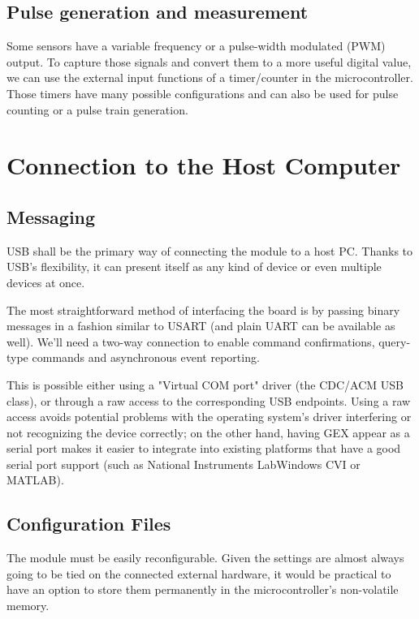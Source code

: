 \subsection{Pulse generation and measurement}

Some sensors have a variable frequency or a pulse-width modulated (PWM) output. To capture those signals and convert them to a more useful digital value, we can use the external input functions of a timer/counter in the microcontroller. Those timers have many possible configurations and can also be used for pulse counting or a pulse train generation.

\section{Connection to the Host Computer}

\subsection{Messaging}

USB shall be the primary way of connecting the module to a host PC. Thanks to USB's flexibility, it can present itself as any kind of device or even multiple devices at once.

The most straightforward method of interfacing the board is by passing binary messages in a fashion similar to USART (and plain UART can be available as well). We'll need a two-way connection to enable command confirmations, query-type commands and asynchronous event reporting.

This is possible either using a "Virtual COM port" driver (the CDC/ACM USB class), or through a raw access to the corresponding USB endpoints. Using a raw access avoids potential problems with the operating system's driver interfering or not recognizing the device correctly; on the other hand, having GEX appear as a serial port makes it easier to integrate into existing platforms that have a good serial port support (such as National Instruments LabWindows CVI or MATLAB).

\subsection{Configuration Files}

The module must be easily reconfigurable. Given the settings are almost always going to be tied on the connected external hardware, it would be practical to have an option to store them permanently in the microcontroller's non-volatile memory.

